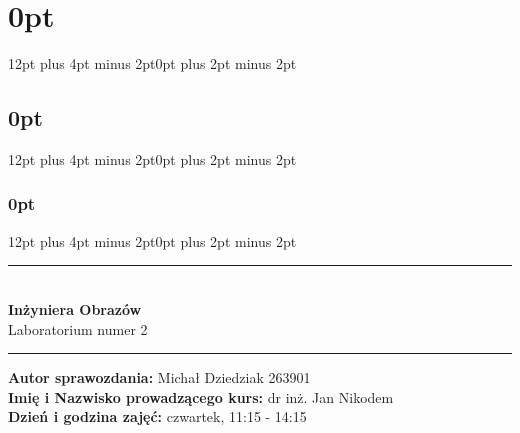% 
% 

\usepackage[margin = 0.7in]{geometry}
\usepackage{graphicx}
\usepackage{graphics}
\usepackage[T1]{fontenc}
\usepackage[polish]{babel}
\usepackage{cmap}
\usepackage[utf8]{inputenc}
\usepackage{float}
\usepackage{tabularx}
\usepackage[table,xcdraw]{xcolor}
\usepackage{lipsum}
\usepackage{titlesec}
\usepackage{minted}
\usepackage{xcolor}
\usepackage{caption}
\usepackage{enumitem}
\usepackage{csvsimple}
\usepackage{natbib}
\usepackage{blindtext}

\usepackage{amsmath} %

\usepackage{numprint} %
\usepackage[round-precision=3,round-mode=figures, scientific-notation=true]{siunitx} %

\usepackage[hidelinks]{hyperref}
\usepackage{url}

\usepackage{bm} %


\usepackage[]{booktabs}
\usepackage{tabularray}
\usepackage{multirow}

\author{Michał Dziedziak}
\date{\today}


\titlespacing\section{0pt}{12pt plus 4pt minus 2pt}{0pt plus 2pt minus 2pt}
\titlespacing\subsection{0pt}{12pt plus 4pt minus 2pt}{0pt plus 2pt minus 2pt}
\titlespacing\subsubsection{0pt}{12pt plus 4pt minus 2pt}{0pt plus 2pt minus 2pt}
\setlength{\parskip}{\baselineskip}%
\setlength{\parindent}{0pt}%

\newcommand{\squeezeup}{\vspace{-5mm}}




\begin{titlepage}
    \begin{center}
        \vspace*{5cm}
        \rule{500pt}{1pt}\\
        \vspace*{0.5cm}
        \LARGE
        \textbf{Inżyniera Obrazów}\\
        \Large
        Laboratorium numer 2
        \vspace*{0.5cm}
        \rule{500pt}{1pt}
    \end{center}

    \vspace*{10cm}

    {\raggedright
        \large
        \textbf{Autor sprawozdania:} Michał Dziedziak 263901\\
        \textbf{Imię i Nazwisko prowadzącego kurs:} dr inż. Jan Nikodem\\
        \textbf{Dzień i godzina zajęć:} czwartek, 11:15 - 14:15
    }
\end{titlepage}



